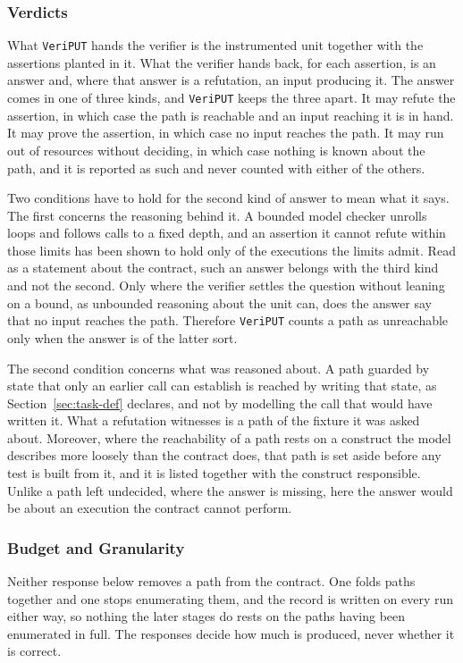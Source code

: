 \documentclass[manuscript,anonymous]{acmart}
\newcommand{\tool}[1]{\texttt{#1}}
\begin{document}
\subsubsection{Verdicts}
What \tool{VeriPUT} hands the verifier is the instrumented unit together with
the assertions planted in it. What the verifier hands back, for each assertion,
is an answer and, where that answer is a refutation, an input producing it. The
answer comes in one of three kinds, and \tool{VeriPUT} keeps the three apart. It
may refute the assertion, in which case the path is reachable and an input
reaching it is in hand. It may prove the assertion, in which case no input
reaches the path. It may run out of resources without deciding, in which case
nothing is known about the path, and it is reported as such and never counted
with either of the others.

Two conditions have to hold for the second kind of answer to mean what it says.
The first concerns the reasoning behind it. A bounded model checker unrolls
loops and follows calls to a fixed depth, and an assertion it cannot refute
within those limits has been shown to hold only of the executions the limits
admit. Read as a statement about the contract, such an answer belongs with the
third kind and not the second. Only where the verifier settles the question
without leaning on a bound, as unbounded reasoning about the unit can, does the
answer say that no input reaches the path. Therefore \tool{VeriPUT} counts a
path as unreachable only when the answer is of the latter sort.

The second condition concerns what was reasoned about. A path guarded by state
that only an earlier call can establish is reached by writing that state, as
Section~\ref{sec:task-def} declares, and not by modelling the call that would
have written it. What a refutation witnesses is a path of the fixture it was
asked about. Moreover, where the
reachability of a path rests on a construct the model describes more loosely
than the contract does, that path is set aside before any test is built from it,
and it is listed together with the construct responsible. Unlike a path left
undecided, where the answer is missing, here the answer would be about an
execution the contract cannot perform.

\subsubsection{Budget and Granularity}\label{sec:budget}
Neither response below removes a path from the contract. One folds paths
together and one stops enumerating them, and the record is written on every run
either way, so nothing the later stages do rests on the paths having been
enumerated in full. The responses decide how much is produced, never whether it
is correct.
\end{document}
